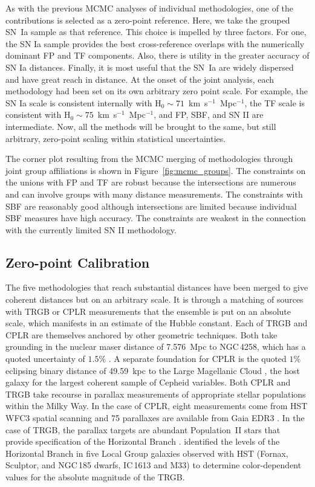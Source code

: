 \documentclass[twocolumn]{aastex63}
\newcommand{\kmsMpc}{\mbox{km s$^{-1}$ Mpc$^{-1}$}}
\begin{document}
As with the previous MCMC analyses of individual methodologies, one of the contributions is selected as a zero-point reference. Here, we take the grouped SN~Ia sample as that reference.  This choice is impelled by three factors.  For one, the SN Ia sample provides the best cross-reference overlaps with the numerically dominant FP and TF components. Also, there is utility in the greater accuracy of SN Ia distances.  Finally, it is most useful that the SN~Ia are widely dispersed and have great reach in distance.  
At the onset of the joint analysis, each methodology had been set on its own arbitrary zero point scale.  For example, the SN Ia scale is consistent internally with H$_0\sim71$~\kmsMpc, the TF scale is consistent with H$_0\sim75$~\kmsMpc, and FP, SBF, and SN II are intermediate.
Now, all the methods will be brought to the same, but still arbitrary, zero-point scaling within statistical uncertainties.

The corner plot resulting from the MCMC merging of methodologies through joint group affiliations is shown in Figure~\ref{fig:mcmc_groups}.  The constraints on the unions with FP and TF are robust because the intersections are numerous and can involve groups with many distance measurements.  The constraints with SBF are reasonably good although intersections are limited because individual SBF measures have high accuracy.  The constraints are weakest in the connection with the currently limited SN II methodology.


\subsection{Zero-point Calibration}
\label{sec:zp}

The five methodologies that reach substantial distances have been merged to give coherent distances but on an arbitrary scale.  It is through a matching of sources with TRGB or CPLR measurements that the ensemble is put on an absolute scale, which manifests in an estimate of the Hubble constant.  Each of TRGB and CPLR are themselves anchored by other geometric techniques.  Both take grounding in the nuclear maser distance of 7.576~Mpc to NGC\,4258, which has a quoted uncertainty of $1.5\%$ \citep{2019ApJ...886L..27R}.  A separate foundation for CPLR is the quoted $1\%$ eclipsing binary distance of 49.59~kpc to the Large Magellanic Cloud \citep{2019Natur.567..200P}, the host galaxy for the largest coherent sample of Cepheid variables.  Both CPLR and TRGB take recourse in parallax measurements of appropriate stellar populations within the Milky Way.  In the case of CPLR, eight measurements come from HST WFC3 spatial scanning and 75  parallaxes are available from Gaia EDR3 \citep{2018ApJ...861..126R, 2021ApJ...908L...6R}. In the case of TRGB, the parallax targets are abundant Population~II stars that provide specification of the Horizontal Branch \citep{2000ApJ...533..215C}.  \citet{2007ApJ...661..815R} identified the levels of the Horizontal Branch in five Local Group galaxies observed with HST (Fornax, Sculptor, and NGC\,185 dwarfs, IC\,1613 and M33) to determine color-dependent values for the absolute magnitude of the TRGB.
\end{document}
